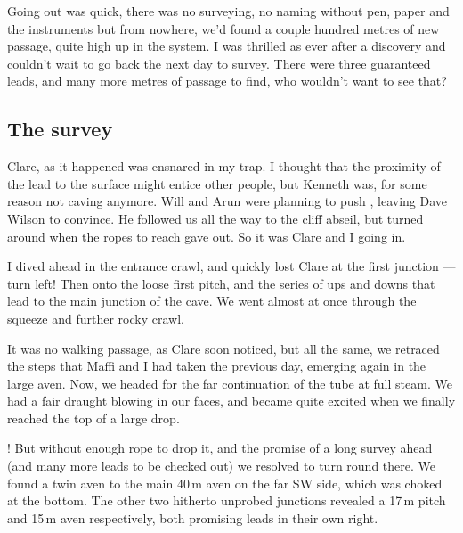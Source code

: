 \begin{marginsurvey}
e{Cloaca Maxima}, leading to more horizontal extensions and a high connection to \protect{} chamber. Slovenian National Grid ESPG 3794}
 \label{Mountain King inset}
\end{marginsurvey}

Going out was quick, there was no surveying, no naming without pen, paper and the instruments but from nowhere, we'd found a couple hundred metres of new passage, quite high up in the system. I was thrilled as ever after a discovery and couldn't wait to go back the next day to survey. There were three guaranteed leads, and many more metres of passage to find, who wouldn't want to see that?

\subsection{The survey}
Clare, as it happened was ensnared in my trap. I thought that the proximity of the lead to the surface might entice other people, but Kenneth was, for some reason not caving anymore. Will and Arun were planning to push , leaving Dave Wilson to convince. He followed us all the way to the cliff abseil, but turned around when the ropes to reach  gave out. So it was Clare and I going in. 

I dived ahead in the entrance crawl, and quickly lost Clare at the first junction --- turn left! Then onto the loose first pitch, and the series of ups and downs that lead to the main junction of the cave. We went  almost at once through the squeeze and further rocky crawl.

It was no walking passage, as Clare soon noticed, but all the same, we retraced the steps that Maffi and I had taken the previous day, emerging again in the large aven. Now, we headed for the far continuation of the tube at full steam. We had a fair draught blowing in our faces, and became quite excited when we finally reached the top of a large drop. 

! But without enough rope to drop it, and the promise of a long survey ahead (and many more leads to be checked out) we resolved to turn round there. We found a twin aven to the main 40\,m aven on the far SW side, which was choked at the bottom. The other two hitherto unprobed junctions revealed a 17\,m pitch and 15\,m aven respectively, both promising leads in their own right.

